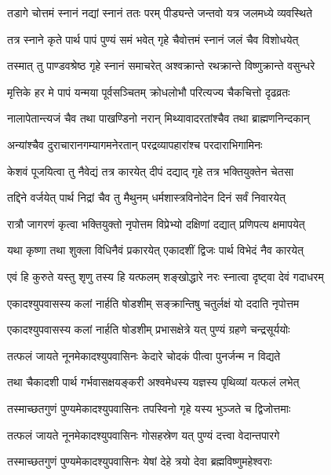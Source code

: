 \twolineshloka
{तडागे चोत्तमं स्नानं नद्यां स्नानं ततः परम्}
{पीड्यन्ते जन्तवो यत्र जलमध्ये व्यवस्थिते}%

\twolineshloka
{तत्र स्नाने कृते पार्थ पापं पुण्यं समं भवेत्}
{गृहे चैवोत्तमं स्नानं जलं चैव विशोधयेत्}%

\twolineshloka
{तस्मात् तु पाण्डवश्रेष्ठ गृहे स्नानं समाचरेत्}
{अश्वक्रान्ते रथक्रान्ते विष्णुक्रान्ते वसुन्धरे}%

\twolineshloka
{मृत्तिके हर मे पापं यन्मया पूर्वसञ्चितम्}
{क्रोधलोभौ परित्यज्य चैकचित्तो दृढव्रतः}%

\twolineshloka
{नालापेतान्त्यजं चैव तथा पाखण्डिनो नरान्}
{मिथ्यावादरतांश्चैव तथा ब्राह्मणनिन्दकान्}%

\twolineshloka
{अन्यांश्चैव दुराचारानगम्यागमनेरतान्}
{परद्रव्यापहारांश्च परदाराभिगामिनः}%

\twolineshloka
{केशवं पूजयित्वा तु नैवेद्यं तत्र कारयेत्}
{दीपं दद्याद् गृहे तत्र भक्तियुक्तेन चेतसा}%

\twolineshloka
{तद्दिने वर्जयेत् पार्थ निद्रां चैव तु मैथुनम्}
{धर्मशास्त्रविनोदेन दिनं सर्वं निवारयेत्}%

\twolineshloka
{रात्रौ जागरणं कृत्वा भक्तियुक्तो नृपोत्तम}
{विप्रेभ्यो दक्षिणां दद्यात् प्रणिपत्य क्षमापयेत्}%

\twolineshloka
{यथा कृष्णा तथा शुक्ला विधिनैवं प्रकारयेत्}
{एकादशीं द्विजः पार्थ विभेदं नैव कारयेत्}%

\twolineshloka
{एवं हि कुरुते यस्तु शृणु तस्य हि यत्फलम्}
{शङ्खोद्धारे नरः स्नात्वा दृष्ट्वा देवं गदाधरम्}%

\twolineshloka
{एकादश्युपवासस्य कलां नार्हति षोडशीम्}
{सङ्क्रान्तिषु चतुर्लक्षं यो ददाति नृपोत्तम}%

\twolineshloka
{एकादश्युपवासस्य कलां नार्हति षोडशीम्}
{प्रभासक्षेत्रे यत् पुण्यं ग्रहणे चन्द्रसूर्ययोः}%

\twolineshloka
{तत्फलं जायते नूनमेकादश्युपवासिनः}
{केदारे चोदकं पीत्वा पुनर्जन्म न विद्यते}%

\twolineshloka
{तथा चैकादशी पार्थ गर्भवासक्षयङ्करी}
{अश्वमेधस्य यज्ञस्य पृथिव्यां यत्फलं लभेत्}%

\twolineshloka
{तस्माच्छतगुणं पुण्यमेकादश्युपवासिनः}
{तपस्विनो गृहे यस्य भुञ्जते च द्विजोत्तमाः}%

\twolineshloka
{तत्फलं जायते नूनमेकादश्युपवासिनः}
{गोसहस्रेण यत् पुण्यं दत्त्वा वेदान्तपारगे}%

\twolineshloka
{तस्माच्छतगुणं पुण्यमेकादश्युपवासिनः}
{येषां देहे त्रयो देवा ब्रह्मविष्णुमहेश्वराः}%

